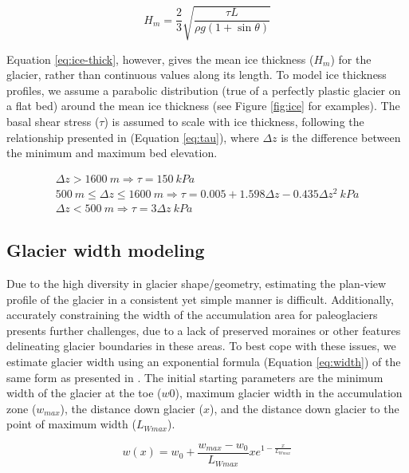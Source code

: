 \documentclass[review]{elsarticle}
\begin{document}
\begin{equation}
\label{eq:ice-thick}
H_m = \frac{2}{3} \sqrt{\frac{\tau L}{\rho g \left( 1+\sin\theta \right)}}
\end{equation}

Equation \ref{eq:ice-thick}, however, gives the mean ice thickness ($H_m$) for the glacier, rather than continuous values along its length.
To model ice thickness profiles, we assume a parabolic distribution (true of a perfectly plastic glacier on a flat bed) around the mean ice thickness (see Figure \ref{fig:ice} for examples).
The basal shear stress ($\tau$) is assumed to scale with ice thickness, following the relationship presented in \cite{haeberli_application_1995} (Equation \ref{eq:tau}), where $\Delta z$ is the difference between the minimum and maximum bed elevation.

\begin{equation}
\label{eq:tau}
\begin{split}
\Delta z > 1600 \:m \Longrightarrow \tau = 150 \:kPa \\
500 \:m \le \Delta z \le 1600 \:m \Longrightarrow \tau = 0.005 + 1.598\Delta z - 0.435\Delta z^2 \:kPa \\
\Delta z < 500 \:m \Longrightarrow \tau = 3\Delta z \:kPa
\end{split}
\end{equation}

\subsection{Glacier width modeling}

Due to the high diversity in glacier shape/geometry, estimating the plan-view profile of the glacier in a consistent yet simple manner is difficult.
Additionally, accurately constraining the width of the accumulation area for paleoglaciers presents further challenges, due to a lack of preserved moraines or other features delineating glacier boundaries in these areas.
To best cope with these issues, we estimate glacier width using an exponential formula (Equation \ref{eq:width}) of the same form as presented in \cite{oerlemans_minimal_2008}.
The initial starting parameters are the minimum width of the glacier at the toe ($w0$), maximum glacier width in the accumulation zone ($w_{max}$), the distance down glacier ($x$), and the distance down glacier to the point of maximum width ($L_{Wmax}$).

\begin{equation}
\label{eq:width}
w(x) = w_0 + \frac{w_{max}-w_0}{L_{Wmax}}xe^{1-\frac{x}{L_{Wmax}}}
\end{equation}
\end{document}
